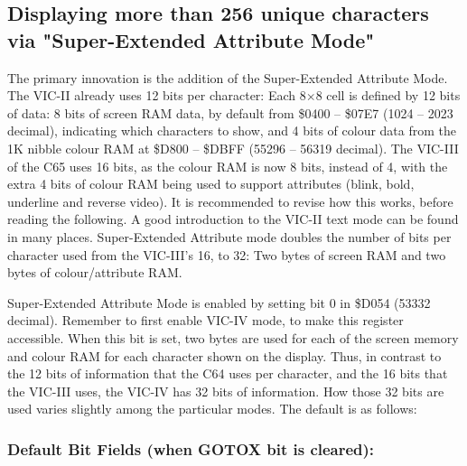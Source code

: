 \subsection{Displaying more than 256 unique characters via
"Super-Extended Attribute Mode"}

The primary innovation is the addition of the Super-Extended Attribute Mode. The VIC-II already uses 12 bits per character: Each 8$\times$8
cell is defined by 12 bits of data: 8 bits of screen RAM data, by
default from \$0400 -- \$07E7 (1024 -- 2023 decimal), indicating which
characters to show, and 4 bits of colour data from the 1K nibble colour
RAM at \$D800 -- \$DBFF (55296 -- 56319 decimal). The VIC-III of the
C65 uses 16 bits, as the colour RAM is now 8 bits, instead of 4, with
the extra 4 bits of colour RAM being used to support attributes (blink,
bold, underline and reverse video).  It is recommended to revise how
this works, before reading the following. A good introduction to the
VIC-II text mode can be found in many places.
Super-Extended Attribute mode doubles the number of bits per character used from the VIC-III’s 16, to 32: Two bytes of screen RAM and two bytes of
colour/attribute RAM.

Super-Extended Attribute Mode is enabled by setting bit 0 in \$D054
(53332 decimal). Remember to first enable VIC-IV mode, to make this
register accessible. When this bit is set, two bytes are used for each
of the screen memory and colour RAM for each character shown on the
display. Thus, in contrast to the 12 bits of information that the C64
uses per character, and the 16 bits that the VIC-III uses, the VIC-IV
has 32 bits of information.  How those 32 bits are used varies slightly
among the particular modes.  The default is as follows:

\subsubsection{Default Bit Fields (when GOTOX bit is cleared):}

